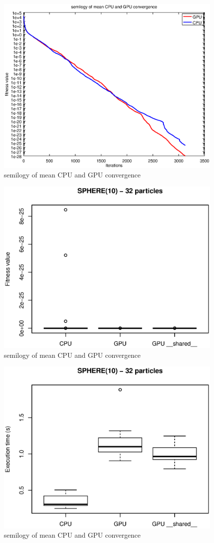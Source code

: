 \documentclass{article}
\begin{document}
	\begin{figure}[!htb]
		\centering
		\includegraphics[width=.8\textwidth]{../img/semilogy_convergence.eps}
		\caption{semilogy of mean CPU and GPU convergence}
		\label{fig:semilogy_convergence}
	\end{figure}


	\begin{figure}[!htb]
		\centering
		\includegraphics[width=.8\textwidth]{../img/sphere10_32particles_fitness.eps}
		\caption{semilogy of mean CPU and GPU convergence}
		\label{fig:semilogy_convergence}
	\end{figure}


	\begin{figure}[!htb]
		\centering
		\includegraphics[width=.8\textwidth]{../img/sphere10_32particles_time.eps}
		\caption{semilogy of mean CPU and GPU convergence}
		\label{fig:semilogy_convergence}
	\end{figure}
\end{document}
